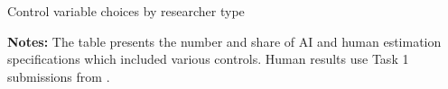 \begin{table}[!htbp]
\centering
\caption{Control variable choices by researcher type}
\label{tab:controls}
\small
\resizebox{\textwidth}{!}{}
\caption*{\textbf{Notes:} The table presents the number and share of AI and human estimation specifications which included various controls. Human results use Task 1 submissions from \citet{huntingtonklein2025sources}.}
\end{table}
\FloatBarrier